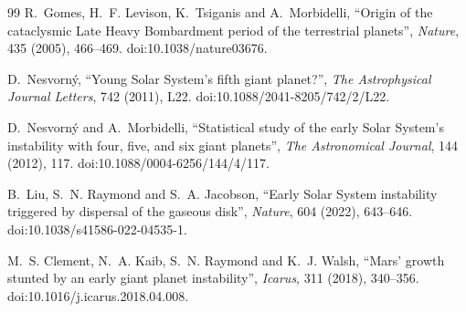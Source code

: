 \documentclass[11pt,a4paper,openany]{report}
\begin{document}
\begin{thebibliography}{99}
 R.~Gomes, H.~F. Levison, K.~Tsiganis and A.~Morbidelli, ``Origin of the
cataclysmic Late Heavy Bombardment period of the terrestrial planets'', \emph{Nature}, 435
(2005), 466--469. doi:10.1038/nature03676.

 D.~Nesvorn\'y, ``Young Solar System's fifth giant planet?'',
\emph{The Astrophysical Journal Letters}, 742 (2011), L22. doi:10.1088/2041-8205/742/2/L22.

 D.~Nesvorn\'y and A.~Morbidelli, ``Statistical study of the early
Solar System's instability with four, five, and six giant planets'', \emph{The Astronomical
Journal}, 144 (2012), 117. doi:10.1088/0004-6256/144/4/117.

 B.~Liu, S.~N. Raymond and S.~A. Jacobson, ``Early Solar System instability
triggered by dispersal of the gaseous disk'', \emph{Nature}, 604 (2022), 643--646.
doi:10.1038/s41586-022-04535-1.

 M.~S. Clement, N.~A. Kaib, S.~N. Raymond and K.~J. Walsh, ``Mars' growth
stunted by an early giant planet instability'', \emph{Icarus}, 311 (2018), 340--356.
doi:10.1016/j.icarus.2018.04.008.

\end{thebibliography}
\end{document}
